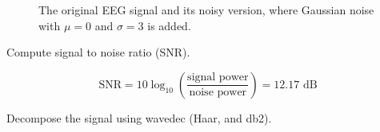 \begin{figure}[H]
    \centering
    \caption{The original EEG signal and its noisy version, where Gaussian noise with $\mu = 0$ and $\sigma = 3$ is added.}
    \label{fig:EEG_with_and_without_noise}
\end{figure}

\vspace{0.5cm}



\begin{tcolorbox}[colback=green!5!white,colframe=green!75!black,title=Problem 2.a]
    Compute signal to noise ratio (SNR).
\end{tcolorbox}


\begin{equation}
    \text{SNR} = 10 \log_{10} \left( \frac{\text{signal power}}{\text{noise power}} \right) = 12.17 \text{ dB}
\end{equation}



\begin{tcolorbox}[colback=green!5!white,colframe=green!75!black,title=Problem 2.b]
    Decompose the signal using wavedec (Haar, and db2).
\end{tcolorbox}


